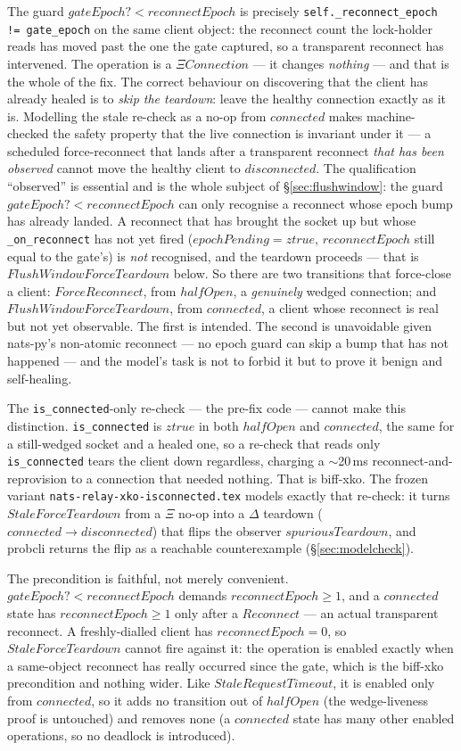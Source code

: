 \documentclass[a4paper,10pt,fleqn]{article}
\begin{document}
The guard $gateEpoch? < reconnectEpoch$ is precisely
\texttt{self.\_reconnect\_epoch != gate\_epoch} on the same client
object: the reconnect count the lock-holder reads has moved past the one
the gate captured, so a transparent reconnect has intervened.  The
operation is a $\Xi Connection$ --- it changes \emph{nothing} --- and
that is the whole of the fix.  The correct behaviour on discovering that
the client has already healed is to \emph{skip the teardown}: leave the
healthy connection exactly as it is.  Modelling the stale re-check as a
no-op from $connected$ makes machine-checked the safety property that
the live connection is invariant under it --- a scheduled force-reconnect
that lands after a transparent reconnect \emph{that has been observed}
cannot move the healthy client to $disconnected$.  The qualification
``observed'' is essential and is the whole subject of
\S\ref{sec:flushwindow}: the guard $gateEpoch? < reconnectEpoch$ can only
recognise a reconnect whose epoch bump has already landed.  A reconnect
that has brought the socket up but whose \texttt{\_on\_reconnect} has not
yet fired ($epochPending = ztrue$, $reconnectEpoch$ still equal to the
gate's) is \emph{not} recognised, and the teardown proceeds --- that is
$FlushWindowForceTeardown$ below.  So there are two transitions that
force-close a client: $ForceReconnect$, from $halfOpen$, a
\emph{genuinely} wedged connection; and $FlushWindowForceTeardown$, from
$connected$, a client whose reconnect is real but not yet observable.
The first is intended.  The second is unavoidable given nats-py's
non-atomic reconnect --- no epoch guard can skip a bump that has not
happened --- and the model's task is not to forbid it but to prove it
benign and self-healing.

The \texttt{is\_connected}-only re-check --- the pre-fix code --- cannot
make this distinction.  \texttt{is\_connected} is $ztrue$ in both
$halfOpen$ and $connected$, the same for a still-wedged socket and a
healed one, so a re-check that reads only \texttt{is\_connected} tears
the client down regardless, charging a $\sim$20\,ms
reconnect-and-reprovision to a connection that needed nothing.  That is
biff-xko.  The frozen variant \texttt{nats-relay-xko-isconnected.tex}
models exactly that re-check: it turns $StaleForceTeardown$ from a $\Xi$
no-op into a $\Delta$ teardown ($connected \to disconnected$) that
flips the observer $spuriousTeardown$, and probcli returns the flip as a
reachable counterexample (\S\ref{sec:modelcheck}).

The precondition is faithful, not merely convenient.
$gateEpoch? < reconnectEpoch$ demands $reconnectEpoch \geq 1$, and a
$connected$ state has $reconnectEpoch \geq 1$ only after a $Reconnect$
--- an actual transparent reconnect.  A freshly-dialled client has
$reconnectEpoch = 0$, so $StaleForceTeardown$ cannot fire against it:
the operation is enabled exactly when a same-object reconnect has really
occurred since the gate, which is the biff-xko precondition and nothing
wider.  Like $StaleRequestTimeout$, it is enabled only from $connected$,
so it adds no transition out of $halfOpen$ (the wedge-liveness proof is
untouched) and removes none (a $connected$ state has many other enabled
operations, so no deadlock is introduced).
\end{document}
